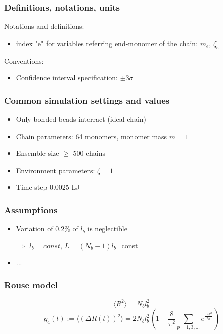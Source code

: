 \documentclass[handout]{beamer}
\newcommand{\mean}[1]{\langle #1 \rangle}
\begin{document}
\begin{frame}
    \frametitle{Definitions, notations, units}

    Notations and definitions:

    \begin{itemize}
        \item index "e" for variables referring end-monomer of the chain: $m_e$, $\zeta_e$ 
    \end{itemize}
    \vspace{1cm}
    Conventions:
    \begin{itemize}
        \item Confidence interval specification: $\pm 3\sigma$ 
    \end{itemize}
\end{frame}
    
\begin{frame}
    \frametitle{Common simulation settings and values}

    \begin{itemize}
        \item Only bonded beads interract (ideal chain)
        \item Chain parameters: 64 monomers, monomer mass $m=1$
        \item Ensemble size $ \ge $ 500 chains
        \item Environment parameters: $\zeta=1$
        \item Time step 0.0025 LJ
    \end{itemize}

\end{frame}

\begin{frame}
    \frametitle{Assumptions}
    \begin{itemize}
        \item Variation of $0.2\%$ of $l_b$ is neglectible \cite{svaneborg_2020} 
        
        $\Rightarrow$ $l_b=const$, $L=(N_b-1) l_b$=const

        \item ...
    \end{itemize} 
\end{frame}


\begin{frame}
    \frametitle{Rouse model}
    \begin{equation}
        \mean{R^2}=N_b l_b^2
    \end{equation}
    \begin{equation}
        g_4(t) := \mean{(\Delta R(t))^2} = 2 N_b l_b^2 (1-\frac{8}{\pi^2}\sum_{p=1,3,...}e^{\frac{-t p^2}{\tau_R}})
    \end{equation}

\end{frame}
\end{document}

